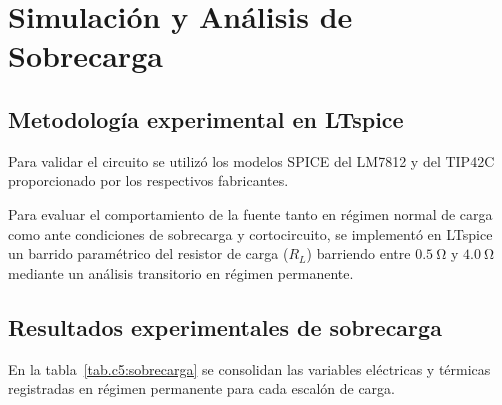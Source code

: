 \chapter{Simulación y Análisis de Sobrecarga}
\label{sec.c5:simulacion}

\section{Metodología experimental en LTspice}
\label{sec.c5:metodologia}

Para validar el circuito se utilizó los modelos SPICE del LM7812 y del TIP42C
proporcionado por los respectivos fabricantes.

Para evaluar el comportamiento de la fuente tanto en régimen normal de carga
como ante condiciones de sobrecarga y cortocircuito, se implementó en LTspice un
barrido paramétrico del resistor de carga ($R_L$) barriendo entre
$\SI{0.5}{\ohm}$ y $\SI{4.0}{\ohm}$ mediante un análisis transitorio en régimen
permanente.

\section{Resultados experimentales de sobrecarga}
\label{sec.c5:resultados_sobrecarga}

En la tabla~\ref{tab.c5:sobrecarga} se consolidan las variables eléctricas y térmicas registradas en régimen
permanente para cada escalón de carga.

